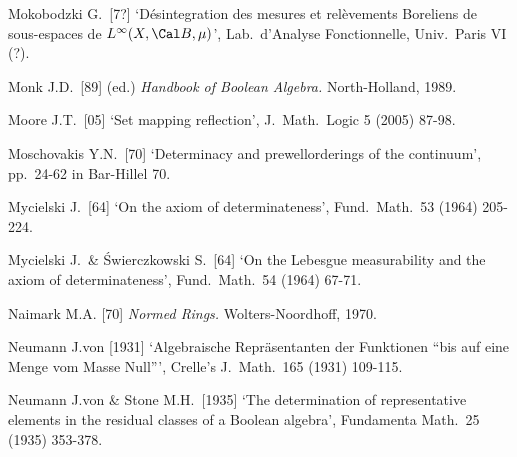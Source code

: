 {Mokobodzki G.\ [7?] `D\'esintegration des mesures et rel\`evements
Boreliens de sous-espaces de $L^{\infty}(X,\Cal B,\mu)$',
Lab.\ d'Analyse Fonctionnelle, Univ.\ Paris VI (?).

Monk J.D.\ [89] (ed.) {\it Handbook of Boolean Algebra.}
North-Holland, 1989.


Moore J.T.\ [05] `Set mapping reflection', J.\ Math.\ Logic 5 (2005) 87-98.
\cmmnt{[517O.]}

Moschovakis Y.N.\ [70] `Determinacy and prewellorderings of the continuum',
pp.\ 24-62 in {\smc Bar-Hillel 70}.
\cmmnt{[567M.]}


Mycielski J.\ [64] `On the axiom of determinateness',
Fund.\ Math.\ 53 (1964) 205-224.
\cmmnt{[567D.]}


Mycielski J.\ \& \'Swierczkowski S.\ [64]
`On the Lebesgue measurability and the axiom of determinateness',
Fund.\ Math.\ 54 (1964) 67-71.
\cmmnt{[567F.]}

\medskip%

Naimark M.A. [70] {\it Normed Rings.}  Wolters-Noordhoff, 1970.
\cmmnt{[\S561 {\it notes\/}.]}

Neumann J.von [1931] `Algebraische Repr\"asentanten der Funktionen ``bis
auf eine Menge vom Masse Null''\nobreak', Crelle's J.\ Math.\ 165 (1931)
109-115.
\cmmnt{[535G.]}

Neumann J.von \& Stone M.H.\ [1935] `The determination of representative
elements in the residual classes of a Boolean algebra', Fundamenta
Math.\ 25 (1935) 353-378.
\cmmnt{[\S535 {\it notes\/}.]}



}
